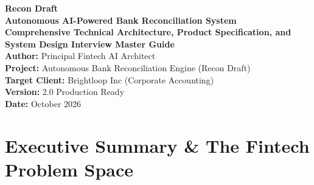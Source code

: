 \documentclass[10pt,a4paper]{article}
\begin{document}
\begin{titlepage}
    \centering
    \vspace*{1.5cm}
    {\Huge \textbf{\color{primaryteal}Recon Draft}}\\[0.4cm]
    {\LARGE \textbf{Autonomous AI-Powered Bank Reconciliation System}}\\[0.8cm]
    {\large \textbf{Comprehensive Technical Architecture, Product Specification, and System Design Interview Master Guide}}\\[1.5cm]
    
    \textbf{Author:} Principal Fintech AI Architect\\
    \textbf{Project:} Autonomous Bank Reconciliation Engine (Recon Draft)\\
    \textbf{Target Client:} Brightloop Inc (Corporate Accounting)\\
    \textbf{Version:} 2.0 Production Ready\\
    \textbf{Date:} October 2026\\[2cm]

    \begin{abstract}
        \noindent This comprehensive technical guide details the end-to-end architecture, mathematical principles, autonomous agent design, and interview defensibility of \textbf{Recon Draft}. Recon Draft is a production-grade, human-in-the-loop autonomous bank reconciliation platform designed for fintech and enterprise accounting. The system reconciles corporate general ledgers against bank statements using a hybrid neuro-symbolic approach: deterministic Python algorithms handle all precision arithmetic, exact transaction matching, and tie-out proof calculations, while Large Language Models (Anthropic Claude 3.5 Sonnet) provide semantic reasoning over ambiguous candidate matches and accounting exceptions. The platform adheres to 8 invariant project rules, features 4 runner architectures ($v_0$, $v_1$, $v_2$, and Replay), and achieves a 100\% benchmark pass rate across clean, timing, fee, transposition error, and adversarial edge cases.
    \end{abstract}
\end{titlepage}

\tableofcontents
\newpage

\section{Executive Summary \& The Fintech Problem Space}
\end{document}
